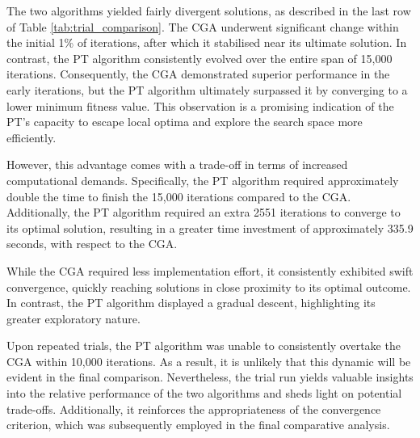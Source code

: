 \documentclass[10pt]{article}
\begin{document}
\begin{multicols}{2}
The two algorithms yielded fairly divergent solutions, as described in the last row of Table \ref{tab:trial_comparison}. The CGA underwent significant change within the initial 1\% of iterations, after which it stabilised near its ultimate solution. In contrast, the PT algorithm consistently evolved over the entire span of 15,000 iterations. Consequently, the CGA demonstrated superior performance in the early iterations, but the PT algorithm ultimately surpassed it by converging to a lower minimum fitness value. This observation is a promising indication of the PT's capacity to escape local optima and explore the search space more efficiently.

However, this advantage comes with a trade-off in terms of increased computational demands. Specifically, the PT algorithm required approximately double the time to finish the 15,000 iterations compared to the CGA. Additionally, the PT algorithm required an extra 2551 iterations to converge to its optimal solution, resulting in a greater time investment of approximately 335.9 seconds, with respect to the CGA.

While the CGA required less implementation effort, it consistently exhibited swift convergence, quickly reaching solutions in close proximity to its optimal outcome. In contrast, the PT algorithm displayed a gradual descent, highlighting its greater exploratory nature. 

Upon repeated trials, the PT algorithm was unable to consistently overtake the CGA within 10,000 iterations. As a result, it is unlikely that this dynamic will be evident in the final comparison. Nevertheless, the trial run yields valuable insights into the relative performance of the two algorithms and sheds light on potential trade-offs. Additionally, it reinforces the appropriateness of the convergence criterion, which was subsequently employed in the final comparative analysis.


\end{multicols}
\end{document}
